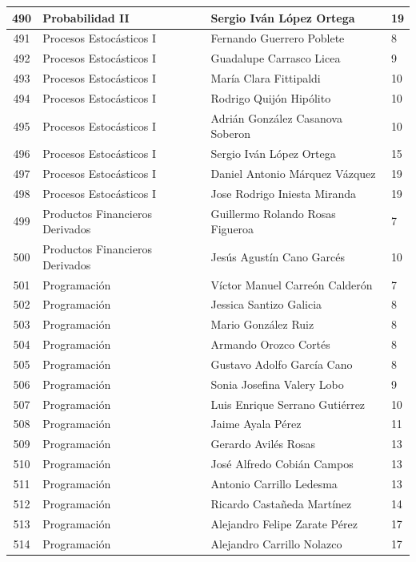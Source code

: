 {\begin{longtable}{|c|p{6.5cm}|p{5cm}|p{1.5cm}|}
490 & Probabilidad II & Sergio Iván López Ortega & 19 \\ \hline
491 & Procesos Estocásticos I & Fernando Guerrero Poblete & 8 \\ \hline
492 & Procesos Estocásticos I & Guadalupe Carrasco Licea & 9 \\ \hline
493 & Procesos Estocásticos I & María Clara Fittipaldi & 10 \\ \hline
494 & Procesos Estocásticos I & Rodrigo Quijón Hipólito & 10 \\ \hline
495 & Procesos Estocásticos I & Adrián González Casanova Soberon & 10 \\ \hline
496 & Procesos Estocásticos I & Sergio Iván López Ortega & 15 \\ \hline
497 & Procesos Estocásticos I & Daniel Antonio Márquez Vázquez & 19 \\ \hline
498 & Procesos Estocásticos I & Jose Rodrigo Iniesta Miranda & 19 \\ \hline
499 & Productos Financieros Derivados & Guillermo Rolando Rosas Figueroa & 7 \\ \hline
500 & Productos Financieros Derivados & Jesús Agustín Cano Garcés & 10 \\ \hline
501 & Programación & Víctor Manuel Carreón Calderón & 7 \\ \hline
502 & Programación & Jessica Santizo Galicia & 8 \\ \hline
503 & Programación & Mario González Ruiz & 8 \\ \hline
504 & Programación & Armando Orozco Cortés & 8 \\ \hline
505 & Programación & Gustavo Adolfo García Cano & 8 \\ \hline
506 & Programación & Sonia Josefina Valery Lobo & 9 \\ \hline
507 & Programación & Luis Enrique Serrano Gutiérrez & 10 \\ \hline
508 & Programación & Jaime Ayala Pérez & 11 \\ \hline
509 & Programación & Gerardo Avilés Rosas & 13 \\ \hline
510 & Programación & José Alfredo Cobián Campos & 13 \\ \hline
511 & Programación & Antonio Carrillo Ledesma & 13 \\ \hline
512 & Programación & Ricardo Castañeda Martínez & 14 \\ \hline
513 & Programación & Alejandro Felipe Zarate Pérez & 17 \\ \hline
514 & Programación & Alejandro Carrillo Nolazco & 17 \\ \hline

\end{longtable}}
